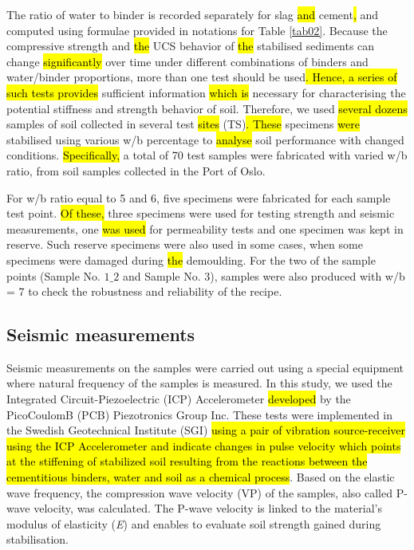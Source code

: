 \documentclass[sustainability,article,submit,pdftex,moreauthors]{Definitions/mdpi}
\begin{document}
The ratio of water to binder is recorded separately for slag \hl{and} cement\hl{, }and computed using formulae provided in notations for Table \ref{tab02}. Because the compressive strength and \hl{the }UCS behavior of \hl{the }stabilised sediments can change \hl{significantly} over time\hl{ }under different combinations of binders\hl{ }and water/binder proportions, more than one test should be used\hl{. Hence, a series of such tests provides} sufficient information \hl{which is} necessary for characterising the potential stiffness and strength behavior of soil. Therefore, we used \hl{several dozens }samples of soil collected in several test \hl{sites} (TS)\hl{. These }specimens \hl{were }stabilised using various w/b percentage to \hl{analyse} soil performance with changed conditions. \hl{Specifically, }a total of 70 test samples were fabricated with varied w/b ratio, from soil samples collected in the Port of Oslo. 

For w/b ratio equal to 5 and 6, five specimens were fabricated for each sample test point. \hl{Of these, }three specimens were used for testing strength and seismic measurements, one \hl{was used }for permeability tests and one specimen was kept in reserve. Such reserve specimens were also used in some cases, when some specimens were damaged during \hl{the }demoulding. For the two of the sample points (Sample No. $1\_2$ and Sample No. 3), samples were also produced with w/b = 7 to check the robustness and reliability of the recipe. 

\subsection{Seismic measurements}

Seismic measurements on the samples were carried out using a special equipment where\hl{ }natural frequency of the samples is measured. In this study, we used the Integrated Circuit-Piezoelectric (ICP) Accelerometer \hl{developed }by the PicoCoulomB (PCB) Piezotronics Group Inc. These tests were implemented in the Swedish Geotechnical Institute (SGI) \hl{using a pair of vibration source-receiver using the ICP Accelerometer and indicate changes in pulse velocity which points at the stiffening of stabilized soil resulting from the reactions between the cementitious binders, water and soil as a chemical process}. Based on the elastic wave frequency, the compression wave velocity (VP) of the samples, also called P-wave velocity, was calculated. The P-wave velocity is linked to the material's modulus of elasticity (\emph{E}) and enables to evaluate soil strength gained during stabilisation. 
\end{document}
